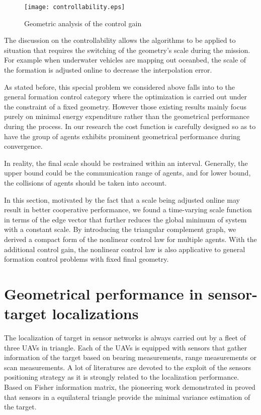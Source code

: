 \documentclass[times]{rncauth}
\begin{document}
\begin{figure}
\begin{center}
\texttt{[image: controllability.eps]}
\caption{Geometric analysis of the control gain }
\label{fig:controllability}
\end{center}
\end{figure}

The discussion on the controllability allows the algorithms to be
applied to situation that requires the switching of the geometry's
scale during the mission. For example when underwater vehicles are
mapping out oceanbed\cite{Kalantar08scale}, the scale of the
formation is adjusted online to decrease the interpolation error.

As stated before, this special problem we considered above falls
into to the general
 formation control category where the optimization is carried out under the constraint of a fixed
 geometry. However those existing results mainly focus purely on
 minimal energy expenditure\cite{Belta04optimal}
  rather than the geometrical performance during the process. In our research the cost
  function is carefully designed so as to have the group of agents
  exhibits prominent geometrical performance during convergence.

  In reality, the final scale  should be restrained within an interval. Generally, the
  upper bound could be the communication
  range of agents, and for lower bound, the collisions of agents should be taken into
  account.

In this section, motivated by the fact that a scale being adjusted
online may result in better cooperative performance, we found a
time-varying scale function in terms of the edge vector 
that further reduces the global minimum of system with a constant
scale. By introducing the triangular complement graph, we derived a
compact form of the nonlinear control law for multiple agents. With
the additional control gain, the nonlinear control law is also
applicative to general formation control problems with fixed final
geometry.

\section{Geometrical performance in sensor-target localizations}\label{sec:localization}
 The localization of target in sensor networks is always carried out by a fleet of
 three
UAVs in triangle. Each of the UAVs is equipped with sensors that
gather information of the target based on bearing
measurements\cite{Dovganccay05bearing}, range
measurements\cite{Martinez06rangelocalization} or scan
measurements\cite{Dogancay07scan}. A lot of literatures are devoted
to the exploit of the sensors positioning strategy as it is strongly
related to the localization performance. Based on Fisher information
matrix, the pioneering work demonstrated in \cite{Bishop10sensor}
proved that sensors in a equilateral triangle provide the minimal
variance estimation of the target.
\end{document}

